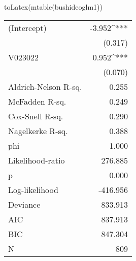\begin{Schunk}
\begin{Sinput}
 toLatex(mtable(bushideoglm1))
\end{Sinput}
\begin{tabular}{lD{.}{.}{3}}
\toprule
(Intercept)          & -3.952^{***}\\
                     & (0.317)     \\
V023022              &  0.952^{***}\\
                     & (0.070)     \\
\midrule
Aldrich-Nelson R-sq. &    0.255\\
McFadden R-sq.       &    0.249\\
Cox-Snell R-sq.      &    0.290\\
Nagelkerke R-sq.     &    0.388\\
phi                  &    1.000\\
Likelihood-ratio     &  276.885\\
p                    &    0.000\\
Log-likelihood       & -416.956\\
Deviance             &  833.913\\
AIC                  &  837.913\\
BIC                  &  847.304\\
N                    &  809    \\
\bottomrule
\end{tabular}\end{Schunk}
